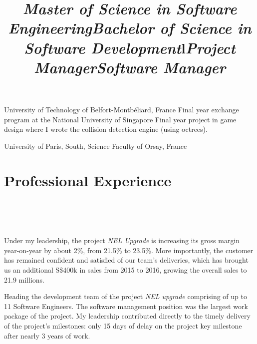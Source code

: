 \documentclass[overlapped,line,letterpaper]{res}
\begin{document}
\begin{resume}
  \title{\em Master of Science in Software Engineering}
  \begin{position}
    University of Technology of Belfort-Montb\'{e}liard, France\newline
    Final year exchange program at the National University of Singapore\newline
    Final year project in game design where I wrote the collision
    detection engine (using octrees).
  \end{position}

  \title{\em Bachelor of Science in Software Development}
  \begin{position}
    University of Paris, South, Science Faculty of Orsay, France
  \end{position}


  \section{\bf Professional Experience}


  \begin{format}
    \title{l}\\
    \\
    \body\\
  \end{format}

  \title{\em Project Manager}
  \begin{position}
    Under my leadership, the project {\em NEL Upgrade} is increasing its gross
    margin year-on-year by about 2\%, from 21.5\% to 23.5\%. More importantly,
    the customer has remained confident and satisfied of our team's deliveries,
    which has brought us an additional S\$400k in sales from 2015 to 2016,
    growing the overall sales to 21.9 millions.
  \end{position}

  \title{\em Software Manager}
  \begin{position}
    Heading the development team of the project {\em NEL upgrade} comprising of
    up to 11 Software Engineers. The software management position was the
    largest work package of the project. My leadership contributed directly to
    the timely delivery of the project's milestones: only 15 days of delay on the
    project key milestone after nearly 3 years of work.
  \end{position}


\end{resume}
\end{document}
